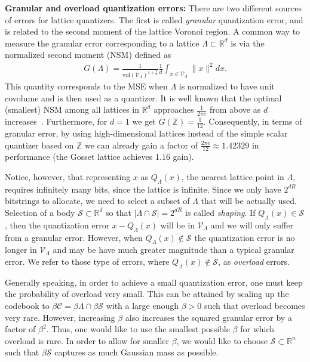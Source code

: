 \documentclass{article}
\newcommand{\RR}{\mathbb{R}}
\newcommand{\m}{\mathcal}
\newcommand{\ZZ}{\mathbb{Z}}
\theoremstyle{plain}
\theoremstyle{definition}
\theoremstyle{remark}
\begin{document}
\textbf{Granular and overload quantization errors:} There are two different sources of errors for lattice quantizers. The first is called \emph{granular} quantization error, and is related to the second moment of the lattice Voronoi region. A common way to measure the granular error corresponding to a lattice $\Lambda\subset\RR^d$ is via the normalized second moment (NSM) defined as
\begin{align}
G(\Lambda)=\frac{1}{\mathrm{vol}(\m{V}_{\Lambda})^{1+\frac{2}{d}}}\frac{1}{d}\int_{x\in \m{V}_{\Lambda}}\|x\|^2dx.
\end{align}
This quantity corresponds to the MSE when $\Lambda$ is normalized to have unit covolume and is then used as a quantizer. It is well known that the optimal (smallest) NSM among all lattices in $\RR^d$ approaches $\frac{1}{2\pi e}$ from above as $d$ increases~\cite{ramiBook}. Furthermore, for $d=1$ we get $G(\ZZ)=\frac{1}{12}$. Consequently, in terms of granular error, by using high-dimensional lattices instead of the simple scalar quantizer based on $\ZZ$ we can already gain a factor of $\frac{2\pi e}{12}\approx 1.42329$ in performance (the Gosset lattice achieves $1.16$ gain).

Notice, however, that representing $x$ as $Q_{\Lambda}(x)$, the nearest lattice point in $\Lambda$, requires infinitely many bits, since the lattice is infinite. Since we only have $2^{dR}$ bitstrings to allocate, we need to select a subset of $\Lambda$ that will be actually used. Selection of a body $\m{S}\subset\RR^d$ so that $|\Lambda\cap \m{S}|=2^{dR}$ is called \emph{shaping}. 
If $Q_{\Lambda}(x)\in\m{S}$, then the quantization error $x-Q_{\Lambda}(x)$ will be in $\m{V}_{\Lambda}$ and we will only suffer from a granular error. However, when $Q_{\Lambda}(x)\notin \m{S}$ the quantization error is no longer in $\m{V}_{\Lambda}$ and may be have much greater magnitude than a typical granular error. We refer to those type of errors, where $Q_{\Lambda}(x)\notin \m{S}$, as \emph{overload} errors. 

Generally speaking, in order to achieve a small quantization error, one must keep the probability of overload very small. This can be attained by scaling up the codebook to $\beta\m{C}=\beta\Lambda\cap \beta \m{S}$ with a large enough $\beta>0$ such that overload becomes very rare. However, increasing $\beta$ also increases the squared granular error by a factor of $\beta^2$. Thus, one would like to use the smallest possible $\beta$ for which overload is rare. In order to allow for smaller $\beta$, we would like to choose $\m{S}\subset\RR^n$ such that $\beta\m{S}$ captures as much Gaussian mass as possible.
\end{document}
